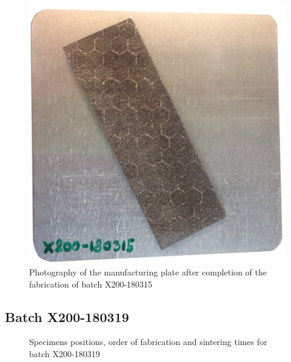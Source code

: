 \begin{figure}[h!]
\centering
\includegraphics[angle=-90,scale=0.22]{Images/180315-real}
\decoRule
\caption[Photography of the manufacturing plate after completion of the fabrication of batch X200-180315]{Photography of the manufacturing plate after completion of the fabrication of batch X200-180315}
\label{fig:180315-real}
\end{figure}

\newpage
\subsection{Batch X200-180319}
\begin{figure}[ht]
\centering
\noindent{}
\decoRule
\caption[Specimens positions, order of fabrication and sintering times for batch X200-180319]{Specimens positions, order of fabrication and sintering times for batch X200-180319}
\label{fig:180315-cad}
\end{figure}

